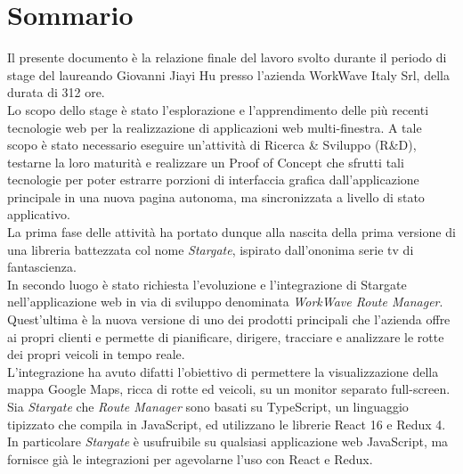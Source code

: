 
\cleardoublepage
{}
{}
\begingroup

\chapter*{Sommario}

Il presente documento è la relazione finale del lavoro svolto durante il periodo di stage del laureando Giovanni Jiayi Hu presso l'azienda WorkWave Italy Srl, della durata di 312 ore. \\

Lo scopo dello stage è stato l'esplorazione e l'apprendimento delle più recenti tecnologie web per la realizzazione di applicazioni web multi-finestra. A tale scopo è stato necessario eseguire un'attività di Ricerca \& Sviluppo (R\&D), testarne la loro maturità e realizzare un Proof of Concept che sfrutti tali tecnologie per poter estrarre porzioni di interfaccia grafica dall'applicazione principale in una nuova pagina autonoma, ma sincronizzata a livello di stato applicativo. \\

La prima fase delle attività ha portato dunque alla nascita della prima versione di una libreria battezzata col nome \textit{Stargate}, ispirato dall'ononima serie tv di fantascienza. \\

In secondo luogo è stato richiesta l'evoluzione e l'integrazione di Stargate nell'applicazione web in via di sviluppo denominata \textit{WorkWave Route Manager}. Quest'ultima è la nuova versione di uno dei prodotti principali che l'azienda offre ai propri clienti e permette di pianificare, dirigere, tracciare e analizzare le rotte dei propri veicoli in tempo reale. \\
L'integrazione ha avuto difatti l'obiettivo di permettere la visualizzazione della mappa Google Maps, ricca di rotte ed veicoli, su un monitor separato full-screen. \\

Sia \textit{Stargate} che \textit{Route Manager} sono basati su TypeScript, un linguaggio tipizzato che compila in JavaScript, ed utilizzano le librerie React 16 e Redux 4. In particolare \textit{Stargate} è usufruibile su qualsiasi applicazione web JavaScript, ma fornisce già le integrazioni per agevolarne l'uso con React e Redux.

%
%

\endgroup			

\vfill

